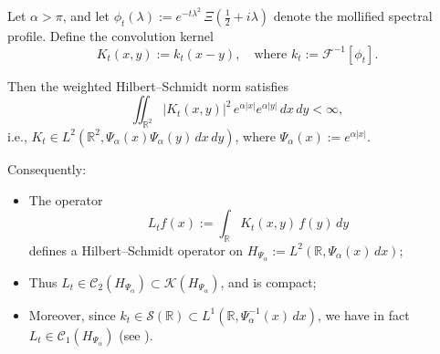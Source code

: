 \begin{lemma}
\label{lem:kernel_L2_weighted_bound}
Let \( \alpha > \pi \), and let \( \phi_t(\lambda) := e^{-t\lambda^2} \, \Xi\left( \tfrac{1}{2} + i\lambda \right) \) denote the mollified spectral profile. Define the convolution kernel
\[
K_t(x,y) := k_t(x - y), \quad \text{where } k_t := \mathcal{F}^{-1}[\phi_t].
\]

Then the weighted Hilbert--Schmidt norm satisfies
\[
\iint_{\mathbb{R}^2} |K_t(x,y)|^2 \, e^{\alpha|x|} e^{\alpha|y|} \, dx \, dy < \infty,
\]
i.e., \( K_t \in L^2(\mathbb{R}^2, \Psi_\alpha(x)\Psi_\alpha(y)\, dx\, dy) \), where \( \Psi_\alpha(x) := e^{\alpha |x|} \).

\medskip
\noindent Consequently:
\begin{itemize}
  \item The operator
  \[
  L_t f(x) := \int_{\mathbb{R}} K_t(x,y)\, f(y)\, dy
  \]
  defines a Hilbert--Schmidt operator on \( H_{\Psi_\alpha} := L^2(\mathbb{R}, \Psi_\alpha(x)\, dx) \);
  \item Thus \( L_t \in \mathcal{C}_2(H_{\Psi_\alpha}) \subset \mathcal{K}(H_{\Psi_\alpha}) \), and is compact;
  \item Moreover, since \( k_t \in \mathcal{S}(\mathbb{R}) \subset L^1(\mathbb{R}, \Psi_\alpha^{-1}(x)\, dx) \), we have in fact \( L_t \in \mathcal{C}_1(H_{\Psi_\alpha}) \) (see ).
\end{itemize}
\end{lemma}
